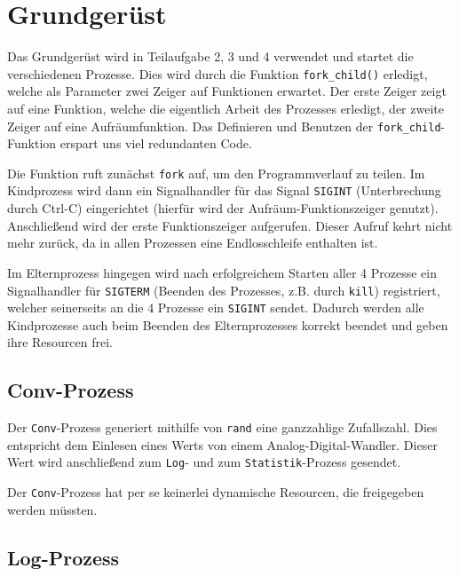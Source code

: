 \documentclass[12pt, a4paper]{scrartcl}
\begin{document}
\pagestyle{fancy}
\newcommand{\np}{\bigskip\noindent}

\setlength{\parindent}{0pt}

\section{Grundgerüst}

Das Grundgerüst wird in Teilaufgabe 2, 3 und 4 verwendet und startet die
verschiedenen Prozesse. Dies wird durch die Funktion \texttt{fork\_child()}
erledigt, welche als Parameter zwei Zeiger auf Funktionen erwartet. Der erste
Zeiger zeigt auf eine Funktion, welche die eigentlich Arbeit des Prozesses
erledigt, der zweite Zeiger auf eine Aufräumfunktion. Das Definieren und
Benutzen der \texttt{fork\_child}-Funktion erspart uns viel redundanten Code.
\np

Die Funktion ruft zunächst \texttt{fork} auf, um den Programmverlauf zu
teilen. Im Kindprozess wird dann ein Signalhandler für das Signal
\texttt{SIGINT} (Unterbrechung durch Ctrl-C) eingerichtet (hierfür wird der
Aufräum-Funktionszeiger genutzt). Anschließend wird der erste Funktionszeiger
aufgerufen. Dieser Aufruf kehrt nicht mehr zurück, da in allen Prozessen eine
Endlosschleife enthalten ist.
\np

Im Elternprozess hingegen wird nach erfolgreichem Starten aller 4 Prozesse ein
Signalhandler für \texttt{SIGTERM} (Beenden des Prozesses, z.B. durch
\texttt{kill}) registriert, welcher seinerseits an die 4 Prozesse ein
\texttt{SIGINT} sendet. Dadurch werden alle Kindprozesse auch beim Beenden des
Elternprozesses korrekt beendet und geben ihre Resourcen frei.

\subsection{Conv-Prozess}

Der \texttt{Conv}-Prozess generiert mithilfe von \texttt{rand} eine
ganzzahlige Zufallszahl. Dies entspricht dem Einlesen eines Werts von einem
Analog-Digital-Wandler. Dieser Wert wird anschließend zum \texttt{Log}- und zum
\texttt{Statistik}-Prozess gesendet.
\np

Der \texttt{Conv}-Prozess hat per se keinerlei dynamische Resourcen, die
freigegeben werden müssten.

\subsection{Log-Prozess}
\end{document}
